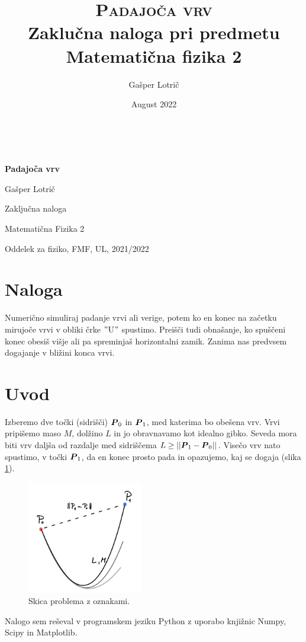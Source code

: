 \documentclass[a4paper, 12pt, slovene]{article}
\title{\textsc{Padajoča vrv} \\[1ex] \large Zaklučna naloga pri predmetu Matematična fizika 2}
\author{Gašper Lotrič}
\date{August 2022}
\numberwithin{equation}{section}
\newcommand{\bi}[1]{\hbox{\boldmath{$#1$}}}
\begin{document}
 $~$ 
 
\vspace{2cm}

\centerline{\bf \huge   Padajoča vrv}
\vspace{1cm}

\centerline{\huge  Gašper Lotrič}
\vspace{1cm}	

\centerline{\large Zaključna naloga}
\vspace{1cm}
  
\centerline{\large Matematična Fizika 2}  
\vspace{1cm}
  
\centerline{\large Oddelek za fiziko, FMF, UL, 2021/2022}  
\vspace{6cm}


\newpage


\tableofcontents
\pagebreak

\section{Naloga}
Numerično simuliraj padanje vrvi ali verige, potem ko en konec na začetku mirujoče vrvi v obliki črke $"$U$"$ spustimo. Preišči tudi obnašanje, ko spuščeni konec obesiš višje ali pa spreminjaš horizontalni zamik. Zanima nas predvsem dogajanje v bližini konca vrvi. 





\section{Uvod}
Izberemo dve točki (sidrišči) ${\bi P_0}$ in ${\bi P_1}$, med katerima bo obešena vrv. Vrvi pripišemo maso $M$, dolžino $L$ in jo obravnavamo kot idealno gibko. Seveda mora biti vrv daljša od razdalje med sidriščema $L \geq ||{\bi P_1} - {\bi P_0}||$. Visečo vrv nato spustimo, v točki ${\bi P_1}$, da en konec prosto pada in opazujemo, kaj se dogaja (slika \ref{f:skica_uvod}).
\begin{figure}[H]
\centering
\includegraphics[width=0.45\textwidth]{slike/skica_uvod.png}
\caption{Skica problema z oznakami.}
\label{f:skica_uvod}
\end{figure}
Nalogo sem reševal v programskem jeziku Python z uporabo knjižnic Numpy, Scipy in Matplotlib.
\end{document}

